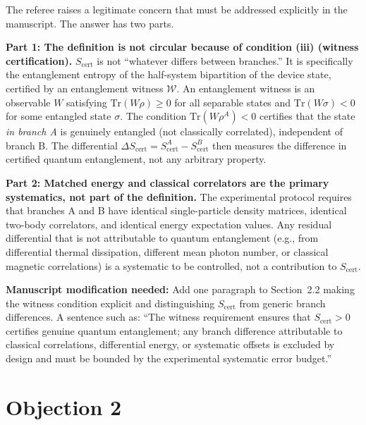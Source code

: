 \documentclass[11pt,letterpaper]{article}
\newcommand{\Scert}{S_{\mathrm{cert}}}
\begin{document}
\begin{tcolorbox}[breakable,enhanced,colback=green!3,colframe=green!55!black,
  fonttitle=\bfseries,title={Response},boxrule=0.8pt]
The referee raises a legitimate concern that must be addressed explicitly in the manuscript.
The answer has two parts.

\textbf{Part 1: The definition is not circular because of condition (iii) (witness certification).}
$\Scert$ is not ``whatever differs between branches.'' It is specifically the entanglement
entropy of the half-system bipartition of the device state, certified by an entanglement
witness $\mathcal{W}$.  An entanglement witness is an observable $W$ satisfying
$\mathrm{Tr}(W\rho) \geq 0$ for all separable states and $\mathrm{Tr}(W\sigma) < 0$ for some
entangled state $\sigma$.  The condition $\mathrm{Tr}(W\rho^A) < 0$ certifies that the
state \emph{in branch A} is genuinely entangled (not classically correlated), independent
of branch B.  The differential $\Delta\Scert = \Scert^A - \Scert^B$ then measures the
difference in certified quantum entanglement, not any arbitrary property.

\textbf{Part 2: Matched energy and classical correlators are the primary systematics,
not part of the definition.}
The experimental protocol requires that branches A and B have identical single-particle
density matrices, identical two-body correlators, and identical energy expectation values.
Any residual differential that is not attributable to quantum entanglement (e.g., from
differential thermal dissipation, different mean photon number, or classical magnetic
correlations) is a systematic to be controlled, not a contribution to $\Scert$.

\textbf{Manuscript modification needed:} Add one paragraph to Section~2.2 making the
witness condition explicit and distinguishing $\Scert$ from generic branch differences.
A sentence such as: ``The witness requirement ensures that $\Scert > 0$ certifies genuine
quantum entanglement; any branch difference attributable to classical correlations,
differential energy, or systematic offsets is excluded by design and must be bounded
by the experimental systematic error budget.''
\end{tcolorbox}

\section*{Objection 2}
\end{document}
